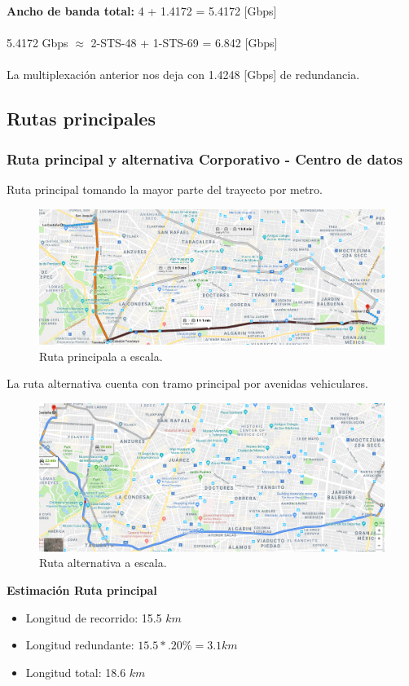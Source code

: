 \documentclass[12pt,letterpaper]{article}
\begin{document}
\textbf{Ancho de banda total: } 4 + 1.4172 = 5.4172 [Gbps]
\\ \\
5.4172 Gbps $\approx$ 2-STS-48 + 1-STS-69 = 6.842 [Gbps]
\\ \\
La multiplexación anterior nos deja con 1.4248 [Gbps] de redundancia.

\newpage
\subsection{Rutas principales}
\subsubsection{Ruta principal y alternativa Corporativo - Centro de datos }
Ruta principal tomando la mayor parte del trayecto por metro.
\begin{figure}[ht]
    \centering
    \includegraphics[width=.9\textwidth]{imagenes/f2.png}
    \caption{Ruta principala a escala.}
\end{figure}

La ruta alternativa cuenta con tramo principal por avenidas 
vehiculares.
\begin{figure}[ht]
    \centering
    \includegraphics[width=.9\textwidth]{imagenes/f3.png}
    \caption{Ruta alternativa a escala.}
\end{figure}

\newpage
\textbf{Estimación Ruta principal}
\begin{itemize}
    \item Longitud de recorrido: 15.5 $km$
    \item Longitud redundante: $15.5*.20\%=3.1km$
    \item Longitud total: 18.6 $km$
\end{itemize}
\end{document}
